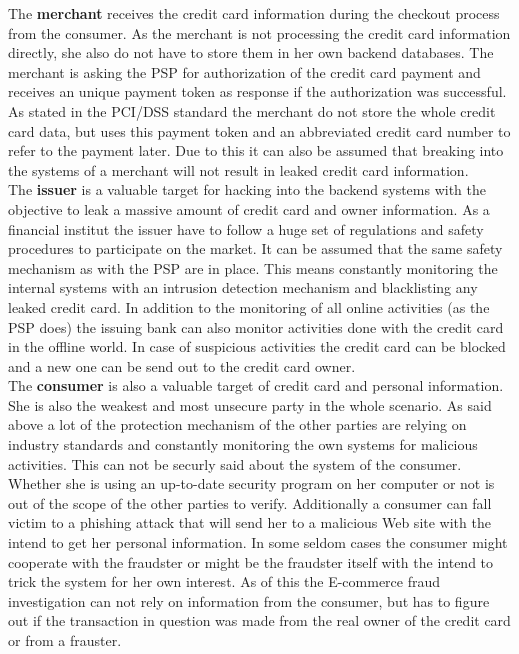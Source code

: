 The \textbf{merchant} receives the credit card information during the checkout process from the consumer. As the merchant is not processing the credit card information directly, she also do not have to store them in her own backend databases. The merchant is asking the \gls{PSP} for authorization of the credit card payment and receives an unique payment token as response if the authorization was successful. As stated in the PCI/DSS standard the merchant do not store the whole credit card data, but uses this payment token and an abbreviated credit card number to refer to the payment later. Due to this it can also be assumed that breaking into the systems of a merchant will not result in leaked credit card information. \\

The \textbf{issuer} is a valuable target for hacking into the backend systems with the objective to leak a massive amount of credit card and owner information. As a financial institut the issuer have to follow a huge set of regulations and safety procedures to participate on the market. It can be assumed that the same safety mechanism as with the \gls{PSP} are in place. This means constantly monitoring the internal systems with an intrusion detection mechanism and blacklisting any leaked credit card. In addition to the monitoring of all online activities (as the \gls{PSP} does) the issuing bank can also monitor activities done with the credit card in the offline world. In case of suspicious activities the credit card can be blocked and a new one can be send out to the credit card owner. \\

The \textbf{consumer} is also a valuable target of credit card and personal information. She is also the weakest and most unsecure party in the whole scenario. As said above a lot of the protection mechanism of the other parties are relying on industry standards and constantly monitoring the own systems for malicious activities. This can not be securly said about the system of the consumer. Whether she is using an up-to-date security program on her computer or not is out of the scope of the other parties to verify. Additionally a consumer can fall victim to a phishing attack that will send her to a malicious Web site with the intend to get her personal information. In some seldom cases the consumer might cooperate with the fraudster or might be the fraudster itself with the intend to trick the system for her own interest. As of this the E-commerce fraud investigation can not rely on information from the consumer, but has to figure out if the transaction in question was made from the real owner of the credit card or from a frauster. \\

